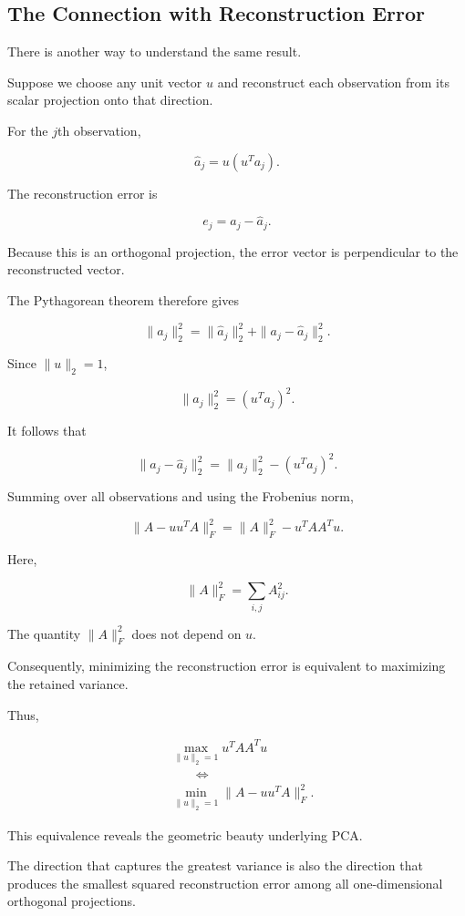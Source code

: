 \documentclass[11pt]{article}
\begin{document}
\subsection{The Connection with Reconstruction Error}

There is another way to
understand the same result.

Suppose we choose any
unit vector $u$ and
reconstruct each observation
from its scalar projection
onto that direction.

For the $j$th observation,

\[
\widehat{a}_j
=
u(u^Ta_j).
\]

The reconstruction error is

\[
e_j=a_j-\widehat{a}_j.
\]

Because this is an
orthogonal projection,
the error vector is
perpendicular to the
reconstructed vector.

The Pythagorean theorem
therefore gives

\[
\|a_j\|_2^2
=
\|\widehat{a}_j\|_2^2
+
\|a_j-\widehat{a}_j\|_2^2.
\]

Since $\|u\|_2=1$,

\[
\|\widehat{a}_j\|_2^2
=
(u^Ta_j)^2.
\]

It follows that

\[
\|a_j-\widehat{a}_j\|_2^2
=
\|a_j\|_2^2-(u^Ta_j)^2.
\]

Summing over all observations
and using the Frobenius norm,

\[
\boxed{
\|A-uu^TA\|_F^2
=
\|A\|_F^2-u^TAA^Tu.
}
\]

Here,

\[
\|A\|_F^2
=
\sum_{i,j}A_{ij}^2.
\]

The quantity $\|A\|_F^2$
does not depend on $u$.

Consequently, minimizing
the reconstruction error
is equivalent to maximizing
the retained variance.

Thus,

\[
\boxed{
\begin{aligned}
&\max_{\|u\|_2=1}
u^TAA^Tu\\[2mm]
&\qquad\Longleftrightarrow\\[2mm]
&\min_{\|u\|_2=1}
\|A-uu^TA\|_F^2.
\end{aligned}
}
\]

This equivalence reveals
the geometric beauty
underlying PCA.

The direction that captures
the greatest variance is
also the direction that
produces the smallest
squared reconstruction error
among all one-dimensional
orthogonal projections.
\end{document}
